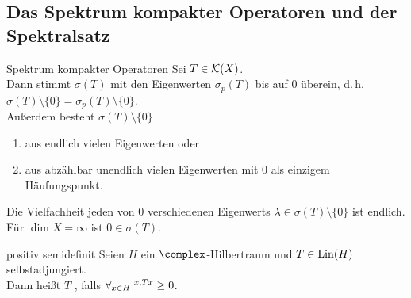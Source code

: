 \pagebreak

\subsection{%
    Das Spektrum kompakter Operatoren und der Spektralsatz%
}

\begin{Satz}{Spektrum kompakter Operatoren}
    Sei $T \in \mathcal{K}(X)$.\\
    Dann stimmt $\sigma(T)$ mit den Eigenwerten $\sigma_p(T)$ bis auf $0$ überein,
    d.\,h. $\sigma(T) \setminus \{0\} = \sigma_p(T) \setminus \{0\}$.\\
    Außerdem besteht $\sigma(T) \setminus \{0\}$
    \begin{enumerate}
        \item
        aus endlich vielen Eigenwerten oder

        \item
        aus abzählbar unendlich vielen Eigenwerten mit $0$ als einzigem Häufungspunkt.
    \end{enumerate}
    Die Vielfachheit jeden von $0$ verschiedenen Eigenwerts
    $\lambda \in \sigma(T) \setminus \{0\}$ ist endlich.\\
    Für $\dim X = \infty$ ist $0 \in \sigma(T)$.
\end{Satz}

\linie

\begin{Def}{positiv semidefinit}
    Seien $H$ ein $\complex$-Hilbertraum und $T \in \operatorname{Lin}(H)$ selbstadjungiert.\\
    Dann heißt $T$ , falls
    $\forall_{x \in H}\; \sp{x, Tx} \ge 0$.
\end{Def}

